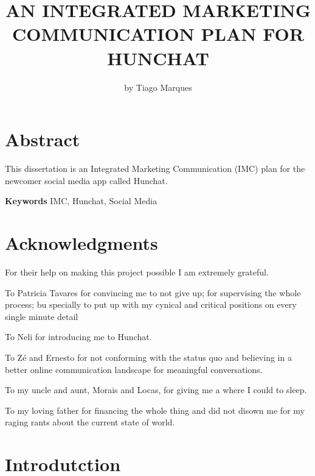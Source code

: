 \documentclass[12pt]{article}
\begin{document}
 

\begin{titlepage}
\title{AN INTEGRATED MARKETING COMMUNICATION PLAN FOR HUNCHAT}
\author{by Tiago Marques}
\maketitle
\end{titlepage}


\section*{Abstract}\label{abst}
This dissertation is an Integrated Marketing Communication (IMC) plan for the newcomer social media app called Hunchat.
  \par
 \textbf{Keywords} IMC, Hunchat, Social Media
\cleardoublepage

\section*{Acknowledgments}

For their help on making this project possible I am extremely grateful.

To Patricia Tavares for convincing me to not give up; for supervising the whole process; bu specially to put up with my cynical and critical positions on every single minute detail

To Neli for introducing me to Hunchat.

To Zé and Ernesto for not conforming with the status quo and believing in a better online communication landscape for meaningful conversations.

To my uncle and aunt, Morais and Locas, for giving me a where I could to sleep.

To my loving father for financing the whole thing and did not disown me for my raging rants about the current state of world.
\cleardoublepage

\thispagestyle{empty}



\tableofcontents
\cleardoublepage 
\listoffigures
\listoftables 
\thispagestyle{empty}
\cleardoublepage 
\setcounter{page}{1}
 
\section{Introdutction}\label{intro}
\end{document}
